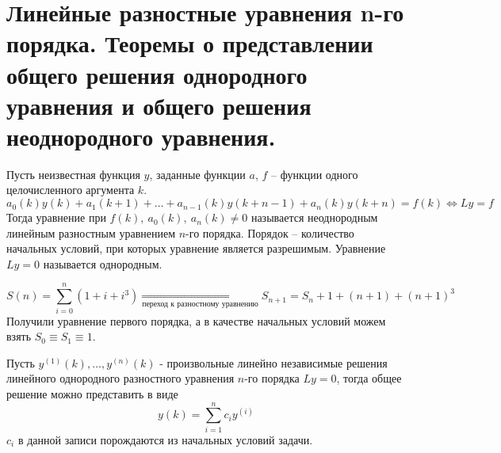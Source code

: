 \section{Линейные разностные уравнения n-го порядка.
  Теоремы о представлении общего решения однородного уравнения
  и общего решения неоднородного уравнения.
 }

\begin{definition}
  Пусть неизвестная функция $y$, заданные функции $a$, $f$
  -- функции одного целочисленного аргумента $k$.
  \[ a_0(k)y(k)+a_1(k+1)+\ldots+a_{n-1}(k)y(k+n-1)+a_n(k)y(k+n)=f(k) \Leftrightarrow Ly=f \]
  Тогда уравнение при $f(k),\ a_0(k),\ a_n(k) \neq 0$ называется
  неоднородным линейным разностным уравнением $n$-го порядка.
  Порядок -- количество начальных условий, при которых уравнение
  является разрешимым. Уравнение $Ly = 0$ называется однородным.
\end{definition}
\begin{example}
  \[S(n)=\sum_{i=0}^{n}(1+i+i^3)\underset{\text{переход к разностному уравнению}}{\Rightarrow}S_{n+1}=S_n+1+(n+1)+(n+1)^3\]
  Получили уравнение первого порядка, а в качестве начальных условий можем взять $S_0\equiv S_1\equiv1$.
\end{example}
\begin{theorem}
  Пусть $y^{(1)}(k),\ldots,y^{(n)}(k)$ - произвольные линейно независимые
  решения линейного однородного разностного уравнения $n$-го порядка
  $Ly=0$, тогда общее решение можно представить в виде
  \[y(k)=\sum_{i=1}^{n}c_iy^{(i)}\]
  $c_i$ в данной записи порождаются из начальных условий задачи.
\end{theorem}
